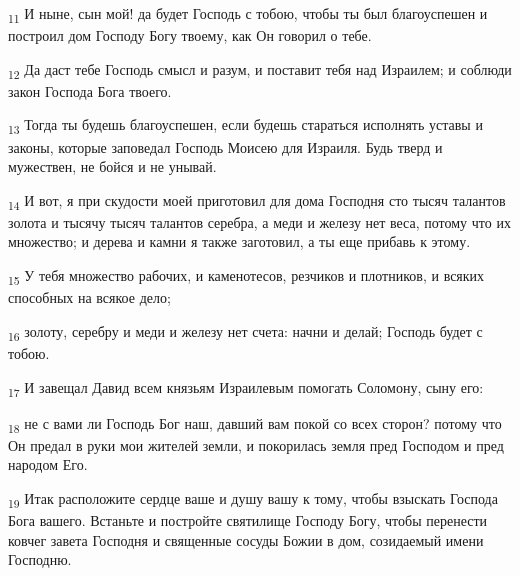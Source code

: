 \begin{tcolorbox}
\textsubscript{11} И ныне, сын мой! да будет Господь с тобою, чтобы ты был благоуспешен и построил дом Господу Богу твоему, как Он говорил о тебе.
\end{tcolorbox}
\begin{tcolorbox}
\textsubscript{12} Да даст тебе Господь смысл и разум, и поставит тебя над Израилем; и соблюди закон Господа Бога твоего.
\end{tcolorbox}
\begin{tcolorbox}
\textsubscript{13} Тогда ты будешь благоуспешен, если будешь стараться исполнять уставы и законы, которые заповедал Господь Моисею для Израиля. Будь тверд и мужествен, не бойся и не унывай.
\end{tcolorbox}
\begin{tcolorbox}
\textsubscript{14} И вот, я при скудости моей приготовил для дома Господня сто тысяч талантов золота и тысячу тысяч талантов серебра, а меди и железу нет веса, потому что их множество; и дерева и камни я также заготовил, а ты еще прибавь к этому.
\end{tcolorbox}
\begin{tcolorbox}
\textsubscript{15} У тебя множество рабочих, и каменотесов, резчиков и плотников, и всяких способных на всякое дело;
\end{tcolorbox}
\begin{tcolorbox}
\textsubscript{16} золоту, серебру и меди и железу нет счета: начни и делай; Господь будет с тобою.
\end{tcolorbox}
\begin{tcolorbox}
\textsubscript{17} И завещал Давид всем князьям Израилевым помогать Соломону, сыну его:
\end{tcolorbox}
\begin{tcolorbox}
\textsubscript{18} не с вами ли Господь Бог наш, давший вам покой со всех сторон? потому что Он предал в руки мои жителей земли, и покорилась земля пред Господом и пред народом Его.
\end{tcolorbox}
\begin{tcolorbox}
\textsubscript{19} Итак расположите сердце ваше и душу вашу к тому, чтобы взыскать Господа Бога вашего. Встаньте и постройте святилище Господу Богу, чтобы перенести ковчег завета Господня и священные сосуды Божии в дом, созидаемый имени Господню.
\end{tcolorbox}
